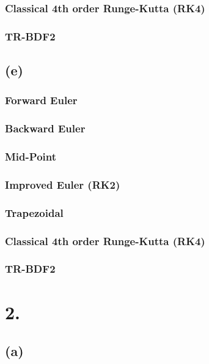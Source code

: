 \documentclass{article}
\begin{document}
\subsubsection*{Classical 4th order Runge-Kutta (RK4)}

\subsubsection*{TR-BDF2}

\subsection*{(e)}
\subsubsection*{Forward Euler}

\subsubsection*{Backward Euler}

\subsubsection*{Mid-Point}

\subsubsection*{Improved Euler (RK2)}

\subsubsection*{Trapezoidal}

\subsubsection*{Classical 4th order Runge-Kutta (RK4)}

\subsubsection*{TR-BDF2}

\section*{2.}
\subsection*{(a)}
\end{document}
